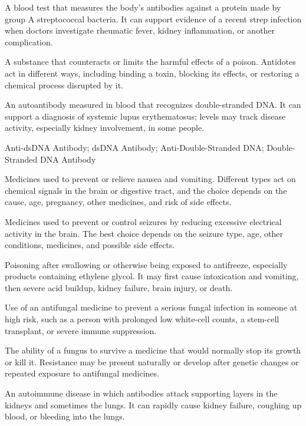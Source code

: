  A blood test that measures the body’s antibodies against a protein made by group A streptococcal bacteria. It can support evidence of a recent strep infection when doctors investigate rheumatic fever, kidney inflammation, or another complication.

 A substance that counteracts or limits the harmful effects
of a poison. Antidotes act in different ways, including binding a toxin,
blocking its effects, or restoring a chemical process disrupted by it.

 An autoantibody measured in blood that recognizes double-stranded DNA. It can support a diagnosis of systemic lupus erythematosus; levels may track disease activity, especially kidney involvement, in some people.

\synonyms
Anti-dsDNA Antibody; dsDNA Antibody; Anti-Double-Stranded DNA; Double-Stranded DNA Antibody

 Medicines used to prevent or relieve nausea and vomiting. Different types act on chemical signals in the brain or digestive tract, and the choice depends on the cause, age, pregnancy, other medicines, and risk of side effects.

 Medicines used to prevent or control seizures by reducing excessive electrical activity in the brain. The best choice depends on the seizure type, age, other conditions, medicines, and possible side effects.

 Poisoning after swallowing or otherwise being exposed to antifreeze, especially products containing ethylene glycol. It may first cause intoxication and vomiting, then severe acid buildup, kidney failure, brain injury, or death.

 Use of an antifungal medicine to prevent a serious fungal infection in someone at high risk, such as a person with prolonged low white-cell counts, a stem-cell transplant, or severe immune suppression.

 The ability of a fungus to survive a medicine that would normally stop its growth or kill it. Resistance may be present naturally or develop after genetic changes or repeated exposure to antifungal medicines.

 An autoimmune disease in which antibodies attack supporting layers in the kidneys and sometimes the lungs. It can rapidly cause kidney failure, coughing up blood, or bleeding into the lungs.

